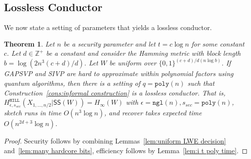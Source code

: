 \documentclass[11pt]{article}
\newcommand{\lemref}[1]{\mbox{Lemma~\ref{#1}}}
\newcommand{\consref}[1]{\mbox{Construction~\ref{#1}}}
\newcommand{\class}[1]{{\ensuremath{\mathsf{#1}}}}
\newcommand{\sketch}{\ensuremath{\class{SS}}\xspace}
\newcommand{\zo}{\ensuremath{\{0, 1\}}}
\newcommand{\hill}{\ensuremath{\mathtt{HILL}}\xspace}
\newcommand{\poly}{\ensuremath{\mathtt{poly}}\xspace}
\newcommand{\ngl}{\ensuremath{\mathtt{ngl}}\xspace}
\newcommand{\LWE}{\class{LWE}}
\newtheorem{theorem}{Theorem}[section]
\begin{document}

\subsection{Lossless Conductor}
\label{sec:lossless conductor}
We now state a setting of parameters that yields a lossless conductor.  


\begin{theorem}
\label{thm:lossless secure conductor log}
Let $n$ be a security parameter and let $t = c\log n$ for some constant $c$.  Let $d\in \mathbb{Z}^+$ be a constant and consider the Hamming metric with block length $b = \log (2n^3 (c+d)/d)$.  Let $W$ be uniform over $\zo^{(c+d)/d(n\log b)}$.  If GAPSVP and SIVP are hard to approximate within polynomial factors using quantum algorithms, then there is a setting of $q = \poly(n)$ such that \consref{cons:informal construction} is a lossless conductor.  That is, $H^{\hill}_{\epsilon, s_{sec}}(X_{1,..., n/2}|\sketch(W)) = H_\infty(W)$
with 
$\epsilon = \ngl(n), s_{sec} = \poly(n)$,  sketch runs in time $O(n^3\log n)$, and recover takes expected time $O(n^{2d+3} \log n)$.
\end{theorem}
\begin{proof}
Security follows by combining Lemmas~\ref{lem:uniform LWE decision} and~\ref{lem:many hardcore bits}, efficiency follows by \lemref{lem:i t poly time}.
\end{proof}
\end{document}

